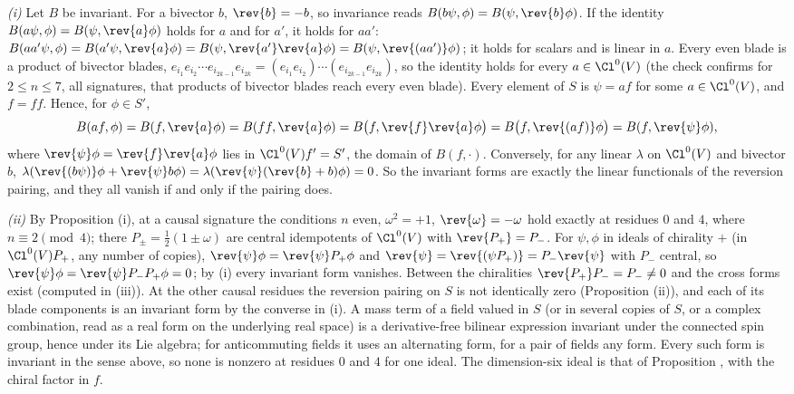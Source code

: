 \emph{(i)} Let $B$ be invariant. For a bivector $b$, $\rev{b} = -b$, so invariance reads $B(b\psi, \phi) = B(\psi, \rev{b}\phi)$. If the identity $B(a\psi, \phi) = B(\psi, \rev{a}\phi)$ holds for $a$ and for $a'$, it holds for $aa'$: $B(aa'\psi, \phi) = B(a'\psi, \rev{a}\phi) = B(\psi, \rev{a'}\rev{a}\phi) = B(\psi, \rev{(aa')}\phi)$; it holds for scalars and is linear in $a$. Every even blade is a product of bivector blades, $e_{i_{1}}e_{i_{2}}\cdots e_{i_{2k-1}}e_{i_{2k}} = (e_{i_{1}}e_{i_{2}})\cdots(e_{i_{2k-1}}e_{i_{2k}})$, so the identity holds for every $a \in \Cl^{0}(V)$ (the check confirms for $2 \le n \le 7$, all signatures, that products of bivector blades reach every even blade). Every element of $S$ is $\psi = af$ for some $a \in \Cl^{0}(V)$, and $f = ff$. Hence, for $\phi \in S'$,
\[
B(af, \phi) = B(f, \rev{a}\phi) = B(ff, \rev{a}\phi) = B\bigl(f, \rev{f}\rev{a}\phi\bigr) = B\bigl(f, \rev{(af)}\phi\bigr) = B(f, \rev{\psi}\phi),
\]
where $\rev{\psi}\phi = \rev{f}\rev{a}\phi$ lies in $\Cl^{0}(V)f' = S'$, the domain of $B(f, \cdot)$. Conversely, for any linear $\lambda$ on $\Cl^{0}(V)$ and bivector $b$, $\lambda(\rev{(b\psi)}\phi + \rev{\psi}b\phi) = \lambda(\rev{\psi}(\rev{b} + b)\phi) = 0$. So the invariant forms are exactly the linear functionals of the reversion pairing, and they all vanish if and only if the pairing does.

\emph{(ii)} By Proposition (i), at a causal signature the conditions $n$ even, $\omega^{2} = +1$, $\rev{\omega} = -\omega$ hold exactly at residues $0$ and $4$, where $n \equiv 2 \pmod 4$; there $P_{\pm} = \tfrac12(1 \pm \omega)$ are central idempotents of $\Cl^{0}(V)$ with $\rev{P_{+}} = P_{-}$. For $\psi, \phi$ in ideals of chirality $+$ (in $\Cl^{0}(V)P_{+}$, any number of copies), $\rev{\psi}\phi = \rev{\psi}P_{+}\phi$ and $\rev{\psi} = \rev{(\psi P_{+})} = P_{-}\rev{\psi}$ with $P_{-}$ central, so $\rev{\psi}\phi = \rev{\psi}P_{-}P_{+}\phi = 0$; by (i) every invariant form vanishes. Between the chiralities $\rev{P_{+}}P_{-} = P_{-} \neq 0$ and the cross forms exist (computed in (iii)). At the other causal residues the reversion pairing on $S$ is not identically zero (Proposition (ii)), and each of its blade components is an invariant form by the converse in (i). A mass term of a field valued in $S$ (or in several copies of $S$, or a complex combination, read as a real form on the underlying real space) is a derivative-free bilinear expression invariant under the connected spin group, hence under its Lie algebra; for anticommuting fields it uses an alternating form, for a pair of fields any form. Every such form is invariant in the sense above, so none is nonzero at residues $0$ and $4$ for one ideal. The dimension-six ideal is that of Proposition , with the chiral factor in $f$.

